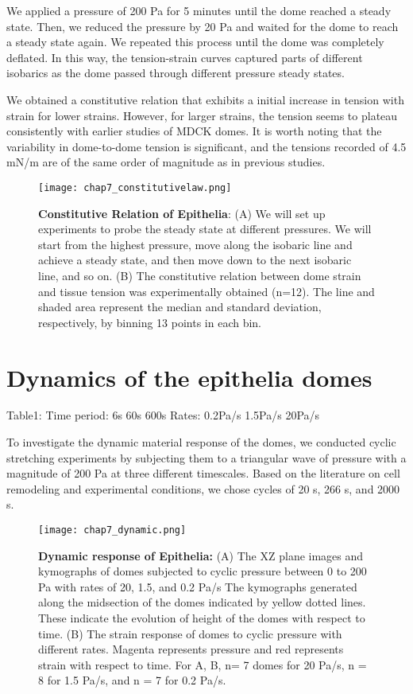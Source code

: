 We applied a pressure of 200 Pa for 5 minutes until the dome reached a
steady state. Then, we reduced the pressure by 20 Pa and waited for the
dome to reach a steady state again. We repeated this process until the
dome was completely deflated. In this way, the tension-strain curves
captured parts of different isobarics as the dome passed through
different pressure steady states.

We obtained a constitutive relation that exhibits a initial increase in
tension with strain for lower strains. However, for larger strains, the
tension seems to plateau consistently with earlier studies of MDCK
domes. It is worth noting that the variability in dome-to-dome tension
is significant, and the tensions recorded of 4.5 mN/m are of the same
order of magnitude as in previous studies.

\begin{figure}
	\centering
	\texttt{[image: chap7\_constitutivelaw.png]}
	\caption{\label{fig_7_5} \textbf{Constitutive Relation of Epithelia}: (A) We will set up experiments to probe the steady state at different pressures. We will start from the highest pressure, move along the isobaric line and achieve a steady state, and then move down to the next isobaric line, and so on.	(B) The constitutive relation between dome strain and tissue tension was experimentally obtained (n=12). The line and shaded area represent the median and standard deviation, respectively, by binning 13 points in each bin.
	}
\end{figure}


\hypertarget{dynamics-of-the-epithelia-domes}{%
	\section{Dynamics of the epithelia
		domes}\label{dynamics-of-the-epithelia-domes}}

Table1: Time period: 6s 60s 600s Rates: 0.2Pa/s 1.5Pa/s 20Pa/s

To investigate the dynamic material response of the domes, we conducted
cyclic stretching experiments by subjecting them to a triangular wave of
pressure with a magnitude of 200 Pa at three different timescales. Based
on the literature on cell remodeling and experimental conditions, we
chose cycles of 20 s, 266 s, and 2000 s.

\begin{figure}
	\centering
	\texttt{[image: chap7\_dynamic.png]}
	\caption{\label{fig_7_6} \textbf{Dynamic response of Epithelia:} (A) The XZ plane images and kymographs of domes subjected to cyclic pressure between 0 to 200 Pa with rates of 20, 1.5, and 0.2 Pa/s The kymographs generated along the midsection of the domes indicated by yellow dotted lines. These indicate the evolution of height of the domes with respect to time. (B) The strain response of domes to cyclic pressure with different rates. Magenta represents pressure and red represents strain with respect to time. For A, B, n= 7 domes for 20 Pa/s, n = 8 for 1.5 Pa/s, and n = 7 for 0.2 Pa/s. 
	}
\end{figure}


